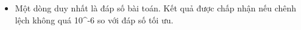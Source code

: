 \begin{itemize}
	\item     Một dòng duy nhất là đáp số bài toán. Kết quả được chấp nhận nếu chênh lệch không quá 10^-6 so với đáp số tối ưu.   
\end{itemize}